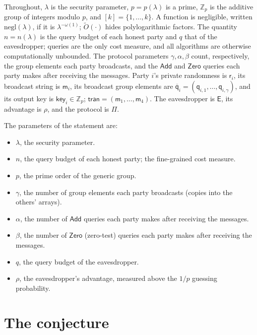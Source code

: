 \documentclass{aicr-conjecture}
\newcommand{\Zp}{\mathbb{Z}_{p}}
\newcommand{\Add}{\mathsf{Add}}
\newcommand{\Zero}{\mathsf{Zero}}
\newcommand{\Ev}{\mathsf{E}}
\newcommand{\tran}{\mathsf{tran}}
\newcommand{\keyv}{\mathsf{key}}
\newcommand{\rv}{\mathsf{r}}
\newcommand{\mv}{\mathsf{m}}
\newcommand{\qv}{\mathsf{q}}
\newcommand{\negl}{\mathrm{negl}}
\begin{document}
Throughout, $\lambda$ is the security parameter, $p = p(\lambda)$ is a
prime, $\Zp$ is the additive group of integers modulo $p$, and
$[k] = \{1,\dots,k\}$. A function is negligible, written
$\negl(\lambda)$, if it is $\lambda^{-\omega(1)}$; $\tilde{O}(\cdot)$
hides polylogarithmic factors. The quantity $n = n(\lambda)$ is the
query budget of each honest party and $q$ that of the eavesdropper;
queries are the only cost measure, and all algorithms are otherwise
computationally unbounded. The protocol parameters $\gamma, \alpha,
\beta$ count, respectively, the group elements each party broadcasts,
and the $\Add$ and $\Zero$ queries each party makes after receiving the
messages. Party $i$'s private randomness is $\rv_{i}$, its broadcast
string is $\mv_{i}$, its broadcast group elements are
$\overline{\qv}_{i} = (\qv_{i,1},\dots,\qv_{i,\gamma})$, and its output
key is $\keyv_{i} \in \Zp$; $\tran = (\mv_{1},\dots,\mv_{4})$. The
eavesdropper is $\Ev$, its advantage is $\rho$, and the protocol is
$\Pi$.

The parameters of the statement are:
\begin{itemize}
\item $\lambda$, the security parameter.
\item $n$, the query budget of each honest party; the fine-grained cost
  measure.
\item $p$, the prime order of the generic group.
\item $\gamma$, the number of group elements each party broadcasts
  (copies into the others' arrays).
\item $\alpha$, the number of $\Add$ queries each party makes after
  receiving the messages.
\item $\beta$, the number of $\Zero$ (zero-test) queries each party
  makes after receiving the messages.
\item $q$, the query budget of the eavesdropper.
\item $\rho$, the eavesdropper's advantage, measured above the $1/p$
  guessing probability.
\end{itemize}

\section{The conjecture}\label{sec:conjectures}
\end{document}
